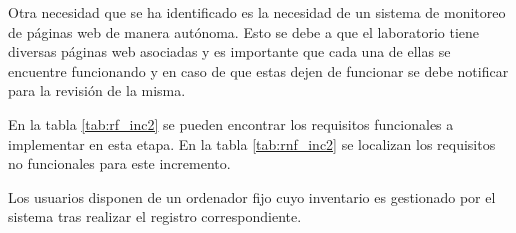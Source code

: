 

Otra necesidad que se ha identificado es la necesidad de un sistema de monitoreo de páginas web de manera autónoma. Esto se debe a que el laboratorio tiene diversas páginas web asociadas y es importante que cada una de ellas se encuentre funcionando y en caso de que estas dejen de funcionar se debe notificar para la revisión de la misma. 

En la tabla \ref{tab:rf_inc2} se pueden encontrar los requisitos funcionales a implementar en esta etapa. En la tabla \ref{tab:rnf_inc2} se localizan los requisitos no funcionales para este incremento. 

Los usuarios disponen de un ordenador fijo cuyo inventario es gestionado por el sistema tras realizar el registro correspondiente.


\renewcommand{\arraystretch}{1.3}


